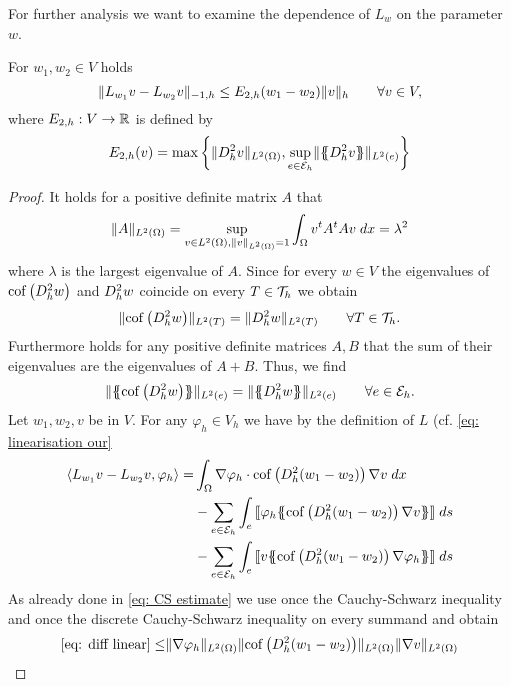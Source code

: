 For further analysis we want to examine the dependence of $L_w$ on the parameter $w$.
\begin{lemma}\label{la: L dependence paramter}
	For $w_1, w_2 \in V$ holds
	\[
		\lVert L_{w_1} v - L_{w_2} v \rVert_{-1,h} \leq E_{2,h}(w_1 - w_2) \lVert v \rVert_{h} \qquad \forall v \in V,
	\]
	where $E_{2,h}:V \rightarrow \mathbb{R}$ is defined by
	\[
		E_{2,h}(v) = \operatorname{max} \left\{  \lVert D_h^2 v \rVert_{L^2(\Omega)},  \sup_{e \in \mathcal{E}_h} \lVert \{\!\!\{ D_h^2 v \}\!\!\} \rVert_{L^2(e)} \right\} 
	\]	
\end{lemma}
\begin{proof}
	It holds for a positive definite matrix $A$ that 
	\begin{align*}
		\lVert A \rVert_{L^2(\Omega)} =  \sup_{v \in L^2(\Omega), \lVert v \rVert_{L^2(\Omega)}=1} \int_{\Omega} {{v^t A^t A v}\;dx} = \lambda^2
	\end{align*}
	where $\lambda$ is the largest eigenvalue of $A$. Since for every $w \in V$ the eigenvalues of $\operatorname{cof} \left( D_h^2 w \right)$ and $D_h^2 w$ coincide on every $T \in \mathcal{T}_h$ we obtain 
	\begin{align}
		\lVert \operatorname{cof} \left( D_h^2 w \right) \rVert_{L^2(T)} = \lVert D_h^2 w \rVert_{L^2(T)} \qquad \forall T \in \mathcal{T}_h.\label{eq: equality norm}
	\end{align}
	Furthermore holds for any positive definite matrices $A,B$ that the sum of their eigenvalues are the eigenvalues of $A+B$. Thus, we find
	\begin{align}
		\LTwonormE{\average {\cofHessH{w}}} = \LTwonormE{\average {\hess{w}}} \qquad \forall e \in \edges. \label{eq: equality norm average}
	\end{align}
	Let $w_1, w_2, v$ be in $V$. For any $\varphi_h \in V_h$ we have by the definition of $L$ (cf. \eqref{eq: linearisation our}
	\begin{align}
		\bilin{L_{w_1}v- L_{w_2} v} {\varphi_h} =  
			&\myIntX  \Omega { \nabla \varphi_h \cdot \cofHessH{(w_1-w_2)} \nabla v}  \nonumber\\
			& -\sum\limits_{e \in \edges}\myIntS e { \jump {\varphi_h \average { \cofHessH{(w_1-w_2)} \nabla v} }} \nonumber \\
			& - \sum\limits_{e \in \edges}\myIntS e { \jump {v \average{ \cofHessH{(w_1-w_2)} \nabla \varphi_h} }} \label{eq: diff linear}
	\end{align}
	As already done in \eqref{eq: CS estimate} we use once the Cauchy-Schwarz inequality and once the discrete Cauchy-Schwarz inequality on every summand and obtain
	\begin{align*}
		\eqref{eq: diff linear}%
		\leq& \LTwonorm{\nabla \varphi_h} \LTwonorm{\cofHessH{(w_1 -w_2)}} \LTwonorm {\nabla v} \nonumber \\

\end{align*}
\end{proof}
